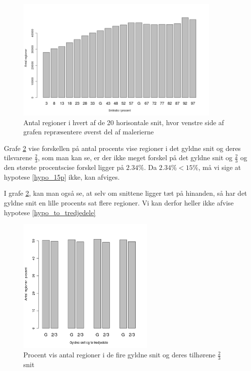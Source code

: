 \begin{figure}[h!]
	\begin{center}
		\includegraphics[width=0.9\textwidth]{afsnit/resultater/billeder/cut2cut3eatsperratio.png}
	\end{center}
	\caption{Antal regioner i hvert af de 20 horisontale snit, hvor venstre side af grafen repræsentere øverst del af malerierne}
	\label{antal_regioner_horisontale_cut}
\end{figure}

Grafe \ref{G_vs_to_trejedele} vise forskellen på antal procents vise
regioner i det gyldne snit og deres tilsvarene $\frac{2}{3}$, som man
kan se, er der ikke meget forskel på det gyldne snit og $\frac{2}{3}$ og
den største procentscise forskel ligger på $2.34\%$. Da $2.34 \% <
15\%$, må vi sige at hypotese \ref{hypo_15p} ikke, kan afviges.

I grafe \ref{G_vs_to_trejedele}, kan man også se, at selv om snittene
ligger tæt på hinanden, så har det gyldne snit en lille procents sat
flere regioner. Vi kan derfor heller ikke afvise hypotese
\ref{hypo_to_tredjedele}

\begin{figure}[h!]
	\begin{center}
		\includegraphics[width=0.6\textwidth]{afsnit/resultater/billeder/G_vs_to_tredjedele.png}
	\end{center}
	\caption{Procent vis antal regioner i de fire gyldne snit og deres tilhørene $\frac{2}{3}$ snit}
	\label{G_vs_to_trejedele}
\end{figure}

